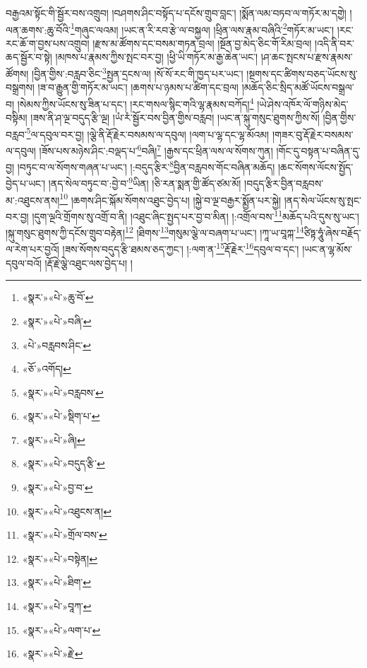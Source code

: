བརྒྱའམ་སྟོང་གི་སྦྱོར་བས་འགྲུབ། །བཤགས་ཤིང་བསྟོད་པ་དངོས་གྲུབ་བླང་། །སྨོན་ལམ་བཏབ་ལ་གཏོར་མ་དགྱེ། །ལན་ཆགས་:ཆུ་བོའི་\footnote{«སྣར་»«པེ་»ཆུ་བོ་}གཞུང་ལའམ། །ཡང་ན་རི་རབ་རྩེ་ལ་བསྐྱལ། །ཕྲིན་ལས་རྣམ་བཞིའི་\footnote{«སྣར་»«པེ་»བཞི་}གཏོར་མ་ཡང་། །རང་རང་ཆོ་ག་བྱས་པས་འགྲུབ། །རྫས་མ་ཚོགས་དང་བསམ་གཏན་བྲལ། །སྔོན་བྱ་མེད་ཅིང་གོ་རིམ་བྲལ། །འདི་ནི་བར་ཆད་སྦྱོར་བ་སྟེ། །མཁས་པ་རྣམས་ཀྱིས་སྤང་བར་བྱ། །ཕྱི་ཡི་གཏོར་མ་རྒྱ་ཆེན་ཡང་། །ཤ་ཆང་སྤངས་པ་རྫས་རྣམས་ཚོགས། །བྱིན་གྱིས་:བརླབ་ཅིང་\footnote{«པེ་»བརླབས་ཤིང་}སྤྱན་དྲངས་ལ། །སོ་སོ་རང་གི་ཁྱད་པར་ཡང་། །སྔགས་དང་ཚིགས་བཅད་ཡོངས་སུ་བསྒྲགས། །ཟ་བ་རྒྱུན་གྱི་གཏོར་མ་ཡང་། །ཆགས་པ་ཉམས་པ་ཚིག་དང་བྲལ། །མཆོད་ཅིང་སྲིད་མཚོ་ཡོངས་བསྒྲལ་བ། །སེམས་ཀྱིས་ཡོངས་སུ་ཟིན་པ་དང་། །རང་གསལ་སྙིང་གའི་ལྷ་རྣམས་བཀོད།\footnote{«ཅོ་»འགོད།} །ཡེ་ཤེས་འཁོར་ལོ་གཉིས་མེད་བསྟིམ། །ཟས་ནི་ཤ་ལྔ་བདུད་རྩི་ལྔ། །ཡཾ་རཾ་སྦྱོར་བས་བྱིན་གྱིས་བརླབ། །ཡང་ན་སྐུ་གསུང་ཐུགས་ཀྱིས་སོ། །བྱིན་གྱིས་བརླབ་\footnote{«སྣར་»«པེ་»བརླབས་}ལ་དབུལ་བར་བྱ། །ལྕེ་ནི་རྡོ་རྗེར་བསམས་ལ་དབུལ། །ལག་པ་ལྷ་དང་ལྷ་མོའམ། །གཟར་བུ་རྡོ་རྗེར་བསམས་ལ་དབུལ། །ཟོས་པས་མཉེས་ཤིང་:བལྡད་པ་\footnote{«སྣར་»«པེ་»སྡིག་པ་}བཞི།\footnote{«སྣར་»«པེ་»ཞི།} །རྒྱས་དང་ཕྲིན་ལས་ལ་སོགས་ཀུན། །གོང་དུ་བསྟན་པ་བཞིན་དུ་བྱ། །བཏུང་བ་ལ་སོགས་གཞན་པ་ཡང་། །:བདུད་རྩིར་\footnote{«སྣར་»«པེ་»བདུད་རྩི་}བྱིན་བརླབས་གོང་བཞིན་མཆོད། །ཆང་སོགས་ལོངས་སྤྱོད་བྱེད་པ་ཡང་། །ནད་སེལ་བཏུང་བ་:བྱེ་བ་\footnote{«སྣར་»«པེ་»བྱ་བ་}ཡིན། །ཅི་རན་སྨན་གྱི་ཚོད་ཙམ་མོ། །བདུད་རྩིར་བྱིན་བརླབས་མ་:འཐུངས་ནས།\footnote{«སྣར་»«པེ་»འཐུངས་ན།} །ཆགས་ཤིང་སྐོམ་སོགས་འཐུང་བྱེད་པ། །སྐྱེ་བ་ལྔ་བརྒྱར་སྨྱོན་པར་སྐྱེ། །ནད་སེལ་ཡོངས་སུ་སྤང་བར་བྱ། །དུག་ལྔའི་གྲོགས་སུ་འགྲོ་བ་ནི། །འཐུང་ཞིང་སྤྱད་པར་བྱ་བ་མིན། །:འགྲོལ་བས་\footnote{«སྣར་»«པེ་»གྲོལ་བས་}མཆོད་པའི་དུས་སུ་ཡང་། །སྐུ་གསུང་ཐུགས་ཀྱི་དངོས་གྲུབ་བརྟེན།\footnote{«སྣར་»«པེ་»བསྟེན།} །ཐིགས་\footnote{«སྣར་»«པེ་»ཐིག་}གསུམ་ལྕེ་ལ་བཞག་པ་ཡང་། །ཀཱ་ཡ་བཱཀྐ་\footnote{«སྣར་»«པེ་»བཱཀ་}ཙིཏྟ་ཧཱུཾ་ཞེས་བརྗོད་ལ་རེག་པར་བྱའོ། །ཟས་སོགས་བདུད་རྩི་ཐམས་ཅད་ཀྱང་། །:ལག་ན་\footnote{«སྣར་»«པེ་»ལག་པ་}རྡོ་རྗེར་\footnote{«སྣར་»«པེ་»རྗེ་}དབུལ་བ་དང་། །ཡང་ན་ལྷ་མོས་དབུལ་བའོ། །རྡོ་རྗེ་ལྕེ་འཐུང་ལས་བྱེད་པ། །
